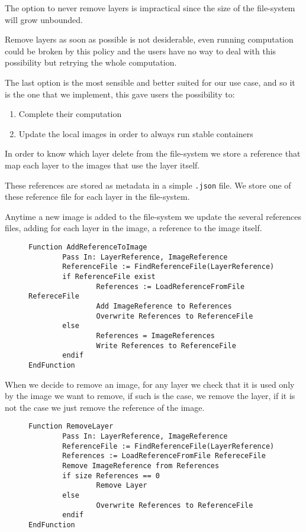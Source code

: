 The option to never remove layers is impractical since the size of the file-system will grow unbounded.

Remove layers as soon as possible is not desiderable, even running computation could be broken by this policy and the users have no way to deal with this possibility but retrying the whole computation.

The last option is the most sensible and better suited for our use case, and so it is the one that we implement, this gave users the possibility to:
\begin{enumerate}
\item Complete their computation
\item Update the local images in order to always run stable containers
\end{enumerate}

In order to know which layer delete from the file-system we store a reference that map each layer to the images that use the layer itself.

These references are stored as metadata in a simple \texttt{.json} file.
We store one of these reference file for each layer in the file-system.

Anytime a new image is added to the file-system we update the several references files, adding for each layer in the image, a reference to the image itself.

\begin{figure}
\begin{lstlisting}[caption={Algorithm to add an image reference to the layer metadata}, label={lst:add-image-reference-to-layer}]
Function AddReferenceToImage
        Pass In: LayerReference, ImageReference
        ReferenceFile := FindReferenceFile(LayerReference)
        if ReferenceFile exist
                References := LoadReferenceFromFile RefereceFile
                Add ImageReference to References
                Overwrite References to ReferenceFile
        else 
                References = ImageReferences
                Write References to ReferenceFile
        endif
EndFunction
\end{lstlisting}
\end{figure}

When we decide to remove an image, for any layer we check that it is used only by the image we want to remove, if such is the case, we remove the layer, if it is not the case we just remove the reference of the image.

\begin{figure}
\begin{lstlisting}[caption={Algorithm to remove an image from the file-system}, label={lst:remove-layer}]
Function RemoveLayer
        Pass In: LayerReference, ImageReference
        ReferenceFile := FindReferenceFile(LayerReference)
        References := LoadReferenceFromFile RefereceFile
        Remove ImageReference from References
        if size References == 0
                Remove Layer
        else
                Overwrite References to ReferenceFile
        endif
EndFunction
\end{lstlisting}
\end{figure}

